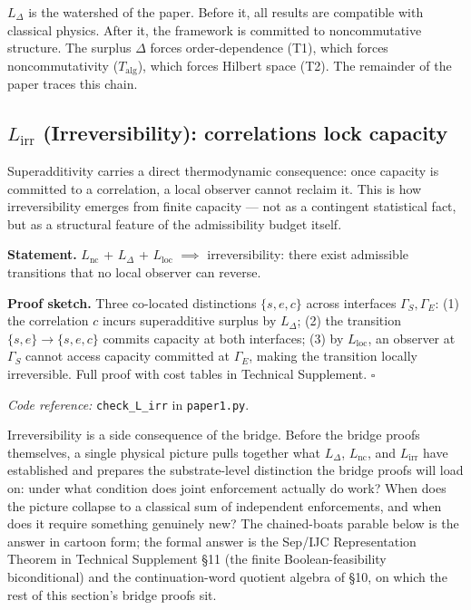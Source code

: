 \documentclass[11pt]{article}
\theoremstyle{remark}
\newcommand{\coderef}[2]{\smallskip\noindent\textit{Code reference:} \texttt{#1} in \texttt{#2}.}
\begin{document}
\smallskip\noindent $L_\Delta$ is the watershed of the paper.  Before it, all results are compatible with classical physics.  After it, the framework is committed to noncommutative structure.  The surplus $\Delta$ forces order-dependence (T1), which forces noncommutativity ($T_{\mathrm{alg}}$), which forces Hilbert space (T2).  The remainder of the paper traces this chain.

\subsection{\texorpdfstring{$L_{\mathrm{irr}}$}{L irr} (Irreversibility): correlations lock capacity}
\label{sec:L_irr}

\noindent Superadditivity carries a direct thermodynamic consequence: once capacity is committed to a correlation, a local observer cannot reclaim it.  This is how irreversibility emerges from finite capacity --- not as a contingent statistical fact, but as a structural feature of the admissibility budget itself.

\begin{tcolorbox}[apfbox, title={Lemma $L_{\mathrm{irr}}$ (Irreversibility)}]
\textbf{Statement.}  $L_{\mathrm{nc}}$ + $L_\Delta$ + $L_{\mathrm{loc}}$ $\implies$ irreversibility: there exist admissible transitions that no local observer can reverse.
\end{tcolorbox}

\smallskip\noindent\textbf{Proof sketch.}  Three co-located distinctions $\{s, e, c\}$ across interfaces $\Gamma_S, \Gamma_E$: (1) the correlation $c$ incurs superadditive surplus by $L_\Delta$; (2) the transition $\{s,e\} \to \{s,e,c\}$ commits capacity at both interfaces; (3) by $L_{\mathrm{loc}}$, an observer at $\Gamma_S$ cannot access capacity committed at $\Gamma_E$, making the transition locally irreversible.  Full proof with cost tables in Technical Supplement.  \hfill$\square$

\coderef{check\_L\_irr}{paper1.py}

\smallskip\noindent Irreversibility is a side consequence of the bridge.  Before the bridge proofs themselves, a single physical picture pulls together what $L_\Delta$, $L_{\mathrm{nc}}$, and $L_{\mathrm{irr}}$ have established and prepares the substrate-level distinction the bridge proofs will load on: under what condition does joint enforcement actually do work?  When does the picture collapse to a classical sum of independent enforcements, and when does it require something genuinely new?  The chained-boats parable below is the answer in cartoon form; the formal answer is the Sep/IJC Representation Theorem in Technical Supplement \S11 (the finite Boolean-feasibility biconditional) and the continuation-word quotient algebra of \S10, on which the rest of this section's bridge proofs sit.
\end{document}
